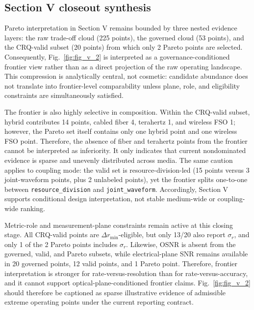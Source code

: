 \documentclass[lettersize,journal]{IEEEtran}
\begin{document}
\subsection*{Section V closeout synthesis}
Pareto interpretation in Section V remains bounded by three nested evidence layers: the raw trade-off cloud (225 points), the governed cloud (53 points), and the CRQ-valid subset (20 points) from which only 2 Pareto points are selected. Consequently, Fig.~\ref{fig:fig_v_2} is interpreted as a governance-conditioned frontier view rather than as a direct projection of the raw operating landscape. This compression is analytically central, not cosmetic: candidate abundance does not translate into frontier-level comparability unless plane, role, and eligibility constraints are simultaneously satisfied.

The frontier is also highly selective in composition. Within the CRQ-valid subset, hybrid contributes 14 points, cabled fiber 4, terahertz 1, and wireless FSO 1; however, the Pareto set itself contains only one hybrid point and one wireless FSO point. Therefore, the absence of fiber and terahertz points from the frontier cannot be interpreted as inferiority. It only indicates that current nondominated evidence is sparse and unevenly distributed across media. The same caution applies to coupling mode: the valid set is resource-division-led (15 points versus 3 joint-waveform points, plus 2 unlabeled points), yet the frontier splits one-to-one between \texttt{resource\_division} and \texttt{joint\_waveform}. Accordingly, Section V supports conditional design interpretation, not stable medium-wide or coupling-wide ranking.

Metric-role and measurement-plane constraints remain active at this closing stage. All CRQ-valid points are $\Delta r_{\min}$-eligible, but only 13/20 also report $\sigma_r$, and only 1 of the 2 Pareto points includes $\sigma_r$. Likewise, OSNR is absent from the governed, valid, and Pareto subsets, while electrical-plane SNR remains available in 20 governed points, 12 valid points, and 1 Pareto point. Therefore, frontier interpretation is stronger for rate-versus-resolution than for rate-versus-accuracy, and it cannot support optical-plane-conditioned frontier claims. Fig.~\ref{fig:fig_v_2} should therefore be captioned as sparse illustrative evidence of admissible extreme operating points under the current reporting contract.
\end{document}
